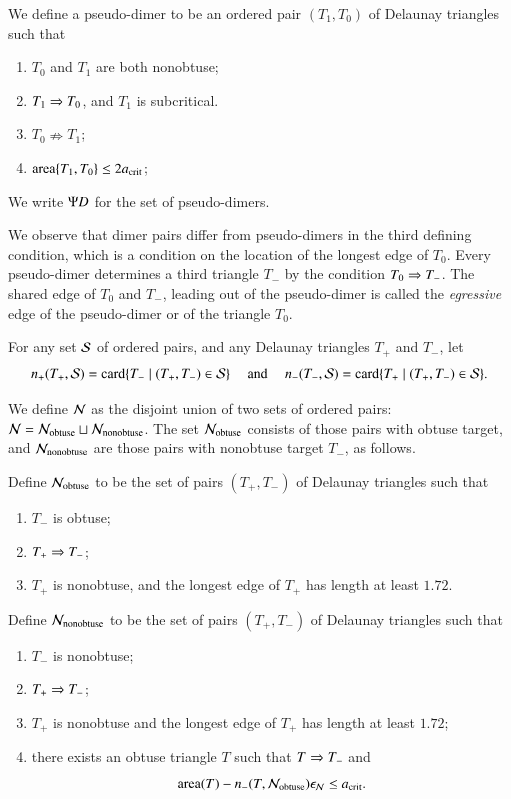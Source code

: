 \begin{definition}
  We define a pseudo-dimer to be an ordered pair $(T_1,T_0)$ of
  Delaunay triangles such that
\begin{enumerate}
\item $T_0$ and $T_1$ are both nonobtuse;
\item $T_1\Rightarrow T_0$, and  $T_1$ is subcritical.
\item $T_0 \nRightarrow T_1$;
\item ${\operatorname{area}}\{T_1,T_0\} \le 2a_\text{crit}$;
\end{enumerate}
We write $\Psi D$ for the set of pseudo-dimers.
\end{definition}

We observe that dimer pairs differ from pseudo-dimers in the third
defining condition, which is a condition on the location of the
longest edge of $T_0$.  Every pseudo-dimer determines a third triangle
$T_-$ by the condition $T_0\Rightarrow T_-$.  The shared edge of $T_0$ and
$T_-$, leading out of the pseudo-dimer is called the {\it egressive} edge of
the pseudo-dimer or of the triangle $T_0$.

For any set $\mathcal S$ of ordered pairs, and any Delaunay triangles $T_+$
and $T_-$, let
\[
n_+(T_+,\mathcal S) = {\operatorname{card}} \{T_-\mid (T_+,T_-)\in \mathcal S\}
\quad\text{ and }\quad
n_-(T_-,\mathcal S)
= {\operatorname{card}} \{T_+\mid (T_+,T_-)\in \mathcal S\}.
\]

We define $\mathcal N$ as the disjoint union of two sets of ordered pairs: $\mathcal N
= \mathcal N_{\text{obtuse}} \sqcup \mathcal N_{\text{nonobtuse}}$.  The set
$\mathcal N_{\text{obtuse}}$ consists of those pairs with obtuse target, and
$\mathcal N_{\text{nonobtuse}}$ are those pairs with nonobtuse target $T_-$,
as follows.

Define $\mathcal N_{\text{obtuse}}$ to be the set of pairs $(T_+,T_-)$ of
Delaunay triangles such that
\begin{enumerate}
\item $T_-$ is obtuse;
\item $T_+\Rightarrow T_-$;
\item $T_+$ is nonobtuse, and the longest edge of $T_+$ has length at
  least $1.72$.
\end{enumerate}

Define  $\mathcal N_{\text{nonobtuse}}$ to 
be the set of pairs $(T_+,T_-)$ of Delaunay triangles such that
\begin{enumerate}
\item $T_-$ is nonobtuse;
\item $T_+\Rightarrow T_-$;
\item $T_+$ is nonobtuse and the longest edge of $T_+$ has length at
  least $1.72$;
\item there exists an obtuse triangle $T$ such that $T\Rightarrow T_-$ and 
\[
{\operatorname{area}}(T) -   n_-(T,\mathcal N_{\text{obtuse}})\epsilon_{\mathcal N}\le a_\text{crit}.
\]
\end{enumerate}

